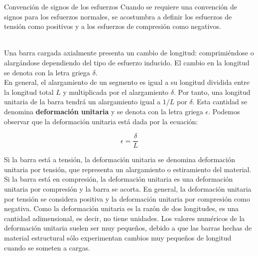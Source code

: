 \documentclass[12pt,letterpaper]{article}
\begin{document}
\begin{informacion}{Convención de signos de los esfuerzos}
Cuando se requiere una convención de signos para los esfuerzos normales, se acostumbra a definir los esfuerzos de tensión 
como positivos y a los esfuerzos de compresión como negativos.
\end{informacion} \hfill \\

Una barra cargada axialmente presenta un cambio de longitud: comprimiéndose o alargándose dependiendo del tipo 
de esfuerzo inducido. El cambio en la longitud se denota con la letra griega $\delta$.\\

En general, el alargamiento de un segmento es igual a su longitud dividida entre la longitud total $L$ y multiplicada 
por el alargamiento $\delta$. Por tanto, una longitud unitaria de la barra tendrá un alargamiento igual a $1/L$ por 
$\delta$. Esta cantidad se denomina \textbf{deformación unitaria} y se denota con la letra griega $\epsilon$. Podemos 
observar que la deformación unitaria está dada por la ecuación:

\begin{equation}
\epsilon = \frac{\delta}{L}
\end{equation}

Si la barra está a tensión, la deformación unitaria se denomina deformación unitaria por tensión, que representa 
un alargamiento o estiramiento del material. Si la barra está en compresión, la deformación unitaria es una deformación 
unitaria por compresión y la barra se acorta. En general, la deformación unitaria por tensión se considera positiva 
y la deformación unitaria por compresión como negativa. Como la deformación unitaria es la razón de dos longitudes, es 
una cantidad adimensional, es decir, no tiene unidades. Los valores numéricos de la deformación 
unitaria suelen ser muy pequeños, debido a que las barras hechas de material estructural sólo experimentan cambios 
muy pequeños de longitud cuando se someten a cargas. \\
\end{document}
